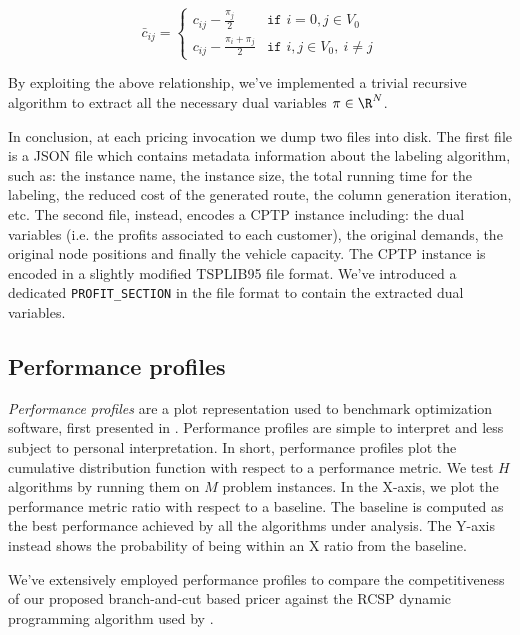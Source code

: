 \begin{equation}
	\bar{c}_{ij} = \begin{cases}
		c_{ij} - \frac{\pi_{j}}{2}       & \texttt{if } i = 0, j \in V_0       \\
		c_{ij} - \frac{\pi_i + \pi_j}{2} & \texttt{if } i, j \in V_0,\ i \ne j
	\end{cases}
\end{equation}

By exploiting the above relationship, we've implemented a trivial recursive algorithm
to extract all the necessary dual variables $\pi \in \R^N$.

In conclusion, at each pricing invocation we dump two files into disk.
The first file is a JSON file which contains metadata information about
the labeling algorithm, such as: the instance name, the instance size,
the total running time for the labeling, the reduced cost of the generated route,
the column generation iteration, etc.
The second file, instead, encodes a CPTP instance including:
the dual variables (i.e. the profits associated to each customer),
the original demands, the original node positions and finally the vehicle capacity.
The CPTP instance is encoded in a slightly modified TSPLIB95 file format.
We've introduced a dedicated \texttt{PROFIT\_SECTION} in the file format
to contain the extracted dual variables.

\subsection{Performance profiles}
\label{sec:results-performance-profiles}

\textit{Performance profiles} are a plot representation used to benchmark optimization software,
first presented in \textcite{dolan2002}.
Performance profiles are simple to interpret and less subject to personal interpretation.
In short, performance profiles plot the cumulative distribution function with respect to a performance metric.
We test $H$ algorithms by running them on $M$ problem instances.
In the X-axis, we plot the performance metric ratio with respect to a baseline.
The baseline is computed as the best performance achieved by all the algorithms under analysis.
The Y-axis instead shows the probability of being within an X ratio from the baseline.

\medskip

We've extensively employed performance profiles to compare the competitiveness of
our proposed branch-and-cut based pricer
against the RCSP dynamic programming algorithm used by \bapcod{} \parencite{pessoa2020generic}.

